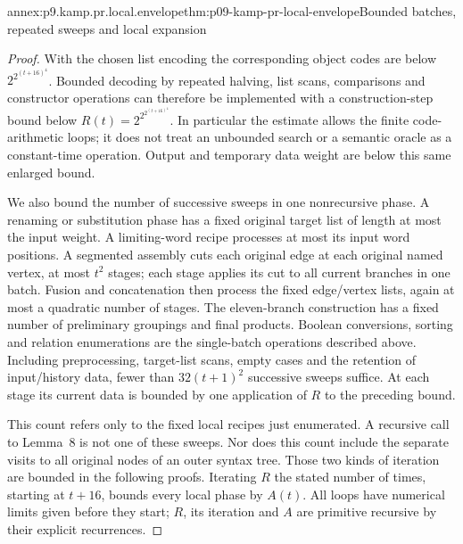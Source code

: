 \begin{annexitem}{annex:p9.kamp.pr.local.envelope}{thm:p09-kamp-pr-local-envelope}{Bounded batches, repeated sweeps and local expansion}
\begin{proof}
With the chosen list encoding the corresponding object codes are
below \(2^{2^{(t+16)^4}}\). Bounded decoding by repeated
halving, list scans, comparisons and constructor operations can
therefore be implemented with a construction-step bound below
\(R(t)=2^{2^{2^{(t+16)^4}}}\). In particular the estimate
allows the finite code-arithmetic loops; it does not treat an
unbounded search or a semantic oracle as a constant-time operation.
Output and temporary data weight are below this same enlarged bound.

We also bound the number of successive sweeps in one nonrecursive
phase. A renaming or substitution phase has a fixed original target
list of length at most the input weight. A limiting-word recipe
processes at most its input word positions. A segmented assembly
cuts each original edge at each original named vertex, at most
\(t^2\) stages; each stage applies its cut to all current
branches in one batch. Fusion and concatenation then process the
fixed edge/vertex lists, again at most a quadratic number of stages.
The eleven-branch construction has a fixed number of preliminary
groupings and final products. Boolean conversions, sorting and
relation enumerations are the single-batch operations described
above. Including preprocessing, target-list scans, empty cases and
the retention of input/history data, fewer than \(32(t+1)^2\)
successive sweeps suffice. At each stage its current data is bounded
by one application of \(R\) to the preceding bound.

This count refers only to the fixed local recipes just enumerated.
A recursive call to Lemma~8 is not one of these sweeps. Nor does
this count include the separate visits to all original nodes of
an outer syntax tree. Those two kinds of iteration are bounded
in the following proofs. Iterating \(R\) the stated number
of times, starting at \(t+16\), bounds every local phase by
\(A(t)\). All loops have numerical limits given before they
start; \(R\), its iteration and \(A\) are primitive
recursive by their explicit recurrences.
\end{proof}
\end{annexitem}

